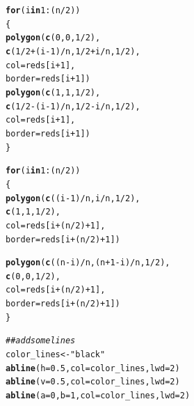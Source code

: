 \documentclass{article}\usepackage[]{graphicx}\usepackage[]{color}
\makeatletter
\newcommand{\hlnum}[1]{\textcolor[rgb]{0.686,0.059,0.569}{#1}}%
\newcommand{\hlstr}[1]{\textcolor[rgb]{0.192,0.494,0.8}{#1}}%
\newcommand{\hlcom}[1]{\textcolor[rgb]{0.678,0.584,0.686}{\textit{#1}}}%
\newcommand{\hlopt}[1]{\textcolor[rgb]{0,0,0}{#1}}%
\newcommand{\hlstd}[1]{\textcolor[rgb]{0.345,0.345,0.345}{#1}}%
\newcommand{\hlkwa}[1]{\textcolor[rgb]{0.161,0.373,0.58}{\textbf{#1}}}%
\newcommand{\hlkwb}[1]{\textcolor[rgb]{0.69,0.353,0.396}{#1}}%
\newcommand{\hlkwc}[1]{\textcolor[rgb]{0.333,0.667,0.333}{#1}}%
\newcommand{\hlkwd}[1]{\textcolor[rgb]{0.737,0.353,0.396}{\textbf{#1}}}%
\newenvironment{kframe}{%
 \def\at@end@of@kframe{}%
 \ifinner\ifhmode%
  \def\at@end@of@kframe{\end{minipage}}%
  \begin{minipage}{\columnwidth}%
 \fi\fi%
 \def\FrameCommand##1{\hskip\@totalleftmargin \hskip-\fboxsep
 \colorbox{shadecolor}{##1}\hskip-\fboxsep
     \hskip-\linewidth \hskip-\@totalleftmargin \hskip\columnwidth}%
 \MakeFramed {\advance\hsize-\width
   \@totalleftmargin\z@ \linewidth\hsize
   \@setminipage}}%
 {\par\unskip\endMakeFramed%
 \at@end@of@kframe}
\newenvironment{knitrout}{}{} %
\makeatother
\begin{document}
\begin{knitrout}
\begin{kframe}
\begin{alltt}
\hlkwa{for}\hlstd{(i} \hlkwa{in} \hlnum{1}\hlopt{:}\hlstd{(n}\hlopt{/}\hlnum{2}\hlstd{))}
\hlstd{\{}
  \hlkwd{polygon}\hlstd{(}\hlkwd{c}\hlstd{(}          \hlnum{0}\hlstd{,}      \hlnum{0}\hlstd{,}\hlnum{1}\hlopt{/}\hlnum{2}\hlstd{),}
          \hlkwd{c}\hlstd{(}\hlnum{1}\hlopt{/}\hlnum{2}\hlopt{+}\hlstd{(i}\hlopt{-}\hlnum{1}\hlstd{)}\hlopt{/}\hlstd{n,}\hlnum{1}\hlopt{/}\hlnum{2}\hlopt{+}\hlstd{i}\hlopt{/}\hlstd{n,}\hlnum{1}\hlopt{/}\hlnum{2}\hlstd{),}
          \hlkwc{col}\hlstd{=reds[i}\hlopt{+}\hlnum{1}\hlstd{],}
          \hlkwc{border} \hlstd{= reds[i}\hlopt{+}\hlnum{1}\hlstd{])}
  \hlkwd{polygon}\hlstd{(}\hlkwd{c}\hlstd{(}          \hlnum{1}\hlstd{,}      \hlnum{1}\hlstd{,}\hlnum{1}\hlopt{/}\hlnum{2}\hlstd{),}
          \hlkwd{c}\hlstd{(}\hlnum{1}\hlopt{/}\hlnum{2}\hlopt{-}\hlstd{(i}\hlopt{-}\hlnum{1}\hlstd{)}\hlopt{/}\hlstd{n,}\hlnum{1}\hlopt{/}\hlnum{2}\hlopt{-}\hlstd{i}\hlopt{/}\hlstd{n,}\hlnum{1}\hlopt{/}\hlnum{2}\hlstd{),}
          \hlkwc{col}\hlstd{=reds[i}\hlopt{+}\hlnum{1}\hlstd{],}
          \hlkwc{border}\hlstd{=reds[i}\hlopt{+}\hlnum{1}\hlstd{])}
\hlstd{\}}

\hlkwa{for}\hlstd{(i} \hlkwa{in} \hlnum{1}\hlopt{:}\hlstd{(n}\hlopt{/}\hlnum{2}\hlstd{))}
\hlstd{\{}
  \hlkwd{polygon}\hlstd{(}\hlkwd{c}\hlstd{((i}\hlopt{-}\hlnum{1}\hlstd{)}\hlopt{/}\hlstd{n,i}\hlopt{/}\hlstd{n,}\hlnum{1}\hlopt{/}\hlnum{2}\hlstd{),}
          \hlkwd{c}\hlstd{(}      \hlnum{1}\hlstd{,}  \hlnum{1}\hlstd{,}\hlnum{1}\hlopt{/}\hlnum{2}\hlstd{),}
          \hlkwc{col}\hlstd{=reds[i}\hlopt{+}\hlstd{(n}\hlopt{/}\hlnum{2}\hlstd{)}\hlopt{+}\hlnum{1}\hlstd{],}
          \hlkwc{border}\hlstd{=reds[i}\hlopt{+}\hlstd{(n}\hlopt{/}\hlnum{2}\hlstd{)}\hlopt{+}\hlnum{1}\hlstd{])}

  \hlkwd{polygon}\hlstd{(}\hlkwd{c}\hlstd{((n}\hlopt{-}\hlstd{i)}\hlopt{/}\hlstd{n,(n}\hlopt{+}\hlnum{1}\hlopt{-}\hlstd{i)}\hlopt{/}\hlstd{n,}\hlnum{1}\hlopt{/}\hlnum{2}\hlstd{),}
          \hlkwd{c}\hlstd{(}      \hlnum{0}\hlstd{,}  \hlnum{0}\hlstd{,}\hlnum{1}\hlopt{/}\hlnum{2}\hlstd{),}
          \hlkwc{col}\hlstd{=reds[i}\hlopt{+}\hlstd{(n}\hlopt{/}\hlnum{2}\hlstd{)}\hlopt{+}\hlnum{1}\hlstd{],}
          \hlkwc{border}\hlstd{=reds[i}\hlopt{+}\hlstd{(n}\hlopt{/}\hlnum{2}\hlstd{)}\hlopt{+}\hlnum{1}\hlstd{])}
\hlstd{\}}

\hlcom{##add some lines}
\hlstd{color_lines} \hlkwb{<-} \hlstr{"black"}
\hlkwd{abline}\hlstd{(}\hlkwc{h}\hlstd{=}\hlnum{0.5}\hlstd{,} \hlkwc{col}\hlstd{=color_lines,} \hlkwc{lwd}\hlstd{=}\hlnum{2}\hlstd{)}
\hlkwd{abline}\hlstd{(}\hlkwc{v}\hlstd{=}\hlnum{0.5}\hlstd{,} \hlkwc{col}\hlstd{=color_lines,} \hlkwc{lwd}\hlstd{=}\hlnum{2}\hlstd{)}
\hlkwd{abline}\hlstd{(}\hlkwc{a} \hlstd{=} \hlnum{0}\hlstd{,} \hlkwc{b}\hlstd{=}\hlnum{1}\hlstd{,} \hlkwc{col}\hlstd{=color_lines,} \hlkwc{lwd}\hlstd{=}\hlnum{2}\hlstd{)}


\end{alltt}
\end{kframe}
\end{knitrout}
\end{document}

